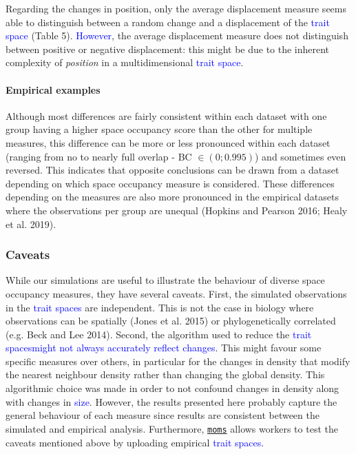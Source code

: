 \documentclass[]{article}
\let\oldparagraph\paragraph
\renewcommand{\paragraph}[1]{\oldparagraph{#1}\mbox{}}
\begin{document}
Regarding the changes in position, only the average displacement measure
seems able to distinguish between a random change and a displacement of
the \textcolor{blue}{trait space} (Table 5).
\textcolor{blue}{However}, the average displacement measure
does not distinguish between positive or negative displacement: this
might be due to the inherent complexity of \emph{position} in a
multidimensional \textcolor{blue}{trait space}.

\paragraph{Empirical examples}\label{empirical-examples-1}

Although most differences are fairly consistent within each dataset with
one group having a higher space occupancy score than the other for
multiple measures, this difference can be more or less pronounced within
each dataset (ranging from no to nearly full overlap - BC
\(\in(0;0.995)\)) and sometimes even reversed. This indicates that
opposite conclusions can be drawn from a dataset depending on which
space occupancy measure is considered. These differences depending on
the measures are also more pronounced in the empirical datasets where
the observations per group are unequal (Hopkins and Pearson 2016; Healy
et al. 2019).

\subsubsection{Caveats}\label{caveats}

While our simulations are useful to illustrate the behaviour of diverse
space occupancy measures, they have several caveats. First, the
simulated observations in the \textcolor{blue}{trait spaces}
are independent. This is not the case in biology where observations can
be spatially (Jones et al. 2015) or phylogenetically correlated (e.g.
Beck and Lee 2014). Second, the algorithm used to reduce the
\textcolor{blue}{trait spacesmight not always accurately reflect changes}.
This might favour some specific measures over others, in particular for
the changes in density that modify the nearest neighbour density rather
than changing the global density. This algorithmic choice was made in
order to not confound changes in density along with changes in
\textcolor{blue}{size}. However, the results presented here
probably capture the general behaviour of each measure since results are
consistent between the simulated and empirical analysis. Furthermore,
\href{https://tguillerme.shinyapps.io/moms/}{\texttt{moms}} allows
workers to test the caveats mentioned above by uploading empirical
\textcolor{blue}{trait spaces}.
\end{document}
